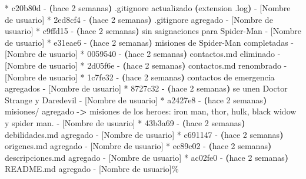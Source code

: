 \documentclass[
]{book}
\newenvironment{Shaded}{\begin{snugshade}}{\end{snugshade}}
\newcommand{\AttributeTok}[1]{\textcolor[rgb]{0.13,0.29,0.53}{#1}}
\newcommand{\ErrorTok}[1]{\textcolor[rgb]{0.64,0.00,0.00}{\textbf{#1}}}
\newcommand{\ExtensionTok}[1]{#1}
\newcommand{\KeywordTok}[1]{\textcolor[rgb]{0.13,0.29,0.53}{\textbf{#1}}}
\newcommand{\NormalTok}[1]{#1}
\newcommand{\OperatorTok}[1]{\textcolor[rgb]{0.81,0.36,0.00}{\textbf{#1}}}
\begin{document}
\begin{Shaded}
\begin{Highlighting}[]
\ExtensionTok{*}\NormalTok{ c20b80d }\AttributeTok{{-}} \ErrorTok{(}\ExtensionTok{hace}\NormalTok{ 2 semanas}\KeywordTok{)} \ExtensionTok{.gitignore}\NormalTok{ actualizado }\ErrorTok{(}\ExtensionTok{extension}\NormalTok{ .log}\KeywordTok{)} \ExtensionTok{{-}}\NormalTok{ [Nombre de usuario]}
\ExtensionTok{*}\NormalTok{ 2ed8cf4 }\AttributeTok{{-}} \ErrorTok{(}\ExtensionTok{hace}\NormalTok{ 2 semanas}\KeywordTok{)} \ExtensionTok{.gitignore}\NormalTok{ agregado }\AttributeTok{{-}}\NormalTok{ [Nombre de usuario]}
\ExtensionTok{*}\NormalTok{ c9ffd15 }\AttributeTok{{-}} \ErrorTok{(}\ExtensionTok{hace}\NormalTok{ 2 semanas}\KeywordTok{)} \ExtensionTok{sin}\NormalTok{ saignaciones para Spider{-}Man }\AttributeTok{{-}}\NormalTok{ [Nombre de usuario]}
\ExtensionTok{*}\NormalTok{ e31eae6 }\AttributeTok{{-}} \ErrorTok{(}\ExtensionTok{hace}\NormalTok{ 2 semanas}\KeywordTok{)} \ExtensionTok{misiones}\NormalTok{ de Spider{-}Man completadas }\AttributeTok{{-}}\NormalTok{ [Nombre de usuario]}
\ExtensionTok{*}\NormalTok{ 0059540 }\AttributeTok{{-}} \ErrorTok{(}\ExtensionTok{hace}\NormalTok{ 2 semanas}\KeywordTok{)} \ExtensionTok{contactos.md}\NormalTok{ eliminado }\AttributeTok{{-}}\NormalTok{ [Nombre de usuario]}
\ExtensionTok{*}\NormalTok{ 2d05f6e }\AttributeTok{{-}} \ErrorTok{(}\ExtensionTok{hace}\NormalTok{ 2 semanas}\KeywordTok{)} \ExtensionTok{contactos.md}\NormalTok{ renombrado }\AttributeTok{{-}}\NormalTok{ [Nombre de usuario]}
\ExtensionTok{*}\NormalTok{ 1c7fe32 }\AttributeTok{{-}} \ErrorTok{(}\ExtensionTok{hace}\NormalTok{ 2 semanas}\KeywordTok{)} \ExtensionTok{contactos}\NormalTok{ de emergencia agregados }\AttributeTok{{-}}\NormalTok{ [Nombre de usuario]}
\ExtensionTok{*}\NormalTok{ 8727c32 }\AttributeTok{{-}} \ErrorTok{(}\ExtensionTok{hace}\NormalTok{ 2 semanas}\KeywordTok{)} \ExtensionTok{se}\NormalTok{ unen Doctor Strange y Daredevil }\AttributeTok{{-}}\NormalTok{ [Nombre de usuario]}
\ExtensionTok{*}\NormalTok{ a2427e8 }\AttributeTok{{-}} \ErrorTok{(}\ExtensionTok{hace}\NormalTok{ 2 semanas}\KeywordTok{)} \ExtensionTok{misiones/}\NormalTok{ agregado }\AttributeTok{{-}}\OperatorTok{\textgreater{}}\NormalTok{ misiones de los heroes: iron man, thor, hulk, black widow y spider man. }\AttributeTok{{-}}\NormalTok{ [Nombre de usuario]}
\ExtensionTok{*}\NormalTok{ 43b3a69 }\AttributeTok{{-}} \ErrorTok{(}\ExtensionTok{hace}\NormalTok{ 2 semanas}\KeywordTok{)} \ExtensionTok{debilidades.md}\NormalTok{ agregado }\AttributeTok{{-}}\NormalTok{ [Nombre de usuario]}
\ExtensionTok{*}\NormalTok{ c691147 }\AttributeTok{{-}} \ErrorTok{(}\ExtensionTok{hace}\NormalTok{ 2 semanas}\KeywordTok{)} \ExtensionTok{origenes.md}\NormalTok{ agregado }\AttributeTok{{-}}\NormalTok{ [Nombre de usuario]}
\ExtensionTok{*}\NormalTok{ ec89c02 }\AttributeTok{{-}} \ErrorTok{(}\ExtensionTok{hace}\NormalTok{ 2 semanas}\KeywordTok{)} \ExtensionTok{descripciones.md}\NormalTok{ agregado }\AttributeTok{{-}}\NormalTok{ [Nombre de usuario]}
\ExtensionTok{*}\NormalTok{ ac02fe0 }\AttributeTok{{-}} \ErrorTok{(}\ExtensionTok{hace}\NormalTok{ 2 semanas}\KeywordTok{)} \ExtensionTok{README.md}\NormalTok{ agregado }\AttributeTok{{-}}\NormalTok{ [Nombre de usuario]\% }
\end{Highlighting}
\end{Shaded}
\end{document}
